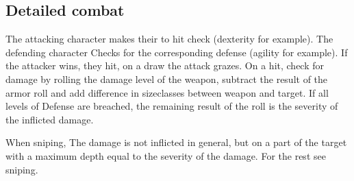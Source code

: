 \subsection{Detailed combat}
The attacking character makes their to hit check (dexterity for example).
The defending character Checks for the
corresponding defense (agility for example).
If the attacker wins, they hit, on a draw the
attack grazes.
On a hit, check for damage by rolling the damage level of the weapon, subtract the result of the
armor roll and add difference in sizeclasses between weapon and target.
If all levels of Defense are breached, the remaining result of the roll is the severity of the inflicted damage.\par
When sniping, The damage is not inflicted in general, but on a part of the target with a maximum depth equal to
the severity of the damage.
For the rest see sniping.